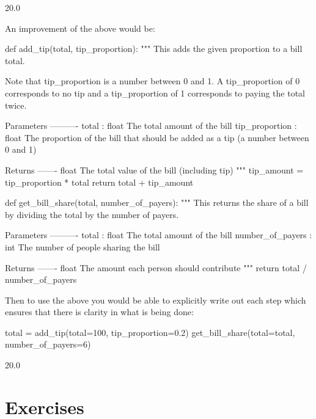 \begin{raw}
20.0
\end{raw}

An improvement of the above would be:

\begin{pyin}
def add_tip(total, tip_proportion):
    """
    This adds the given proportion to a bill total.

    Note that tip_proportion is a number between 0 and 1. A tip_proportion of 0
    corresponds to no tip and a tip_proportion of 1 corresponds to paying the
    total twice.

    Parameters
    ----------
    total : float
        The total amount of the bill
    tip_proportion : float
        The proportion of the bill that should be added as a tip (a number
        between 0 and 1)

    Returns
    -------
    float
        The total value of the bill (including tip)
    """
    tip_amount = tip_proportion * total
    return total + tip_amount


def get_bill_share(total, number_of_payers):
    """
    This returns the share of a bill by dividing the total by the number of
    payers.

    Parameters
    ----------
    total : float
        The total amount of the bill
    number_of_payers : int
        The number of people sharing the bill

    Returns
    -------
    float
        The amount each person should contribute
    """
    return total / number_of_payers
\end{pyin}


Then to use the above you would be able to explicitly write out each step which
ensures that there is clarity in what is being done:

\begin{pyin}
total = add_tip(total=100, tip_proportion=0.2)
get_bill_share(total=total, number_of_payers=6)
\end{pyin}





\begin{raw}
20.0
\end{raw}



\section{Exercises}
\label{\detokenize{building-tools/05-modularisation/exercises/main:exercises}}\label{\detokenize{building-tools/05-modularisation/exercises/main:modularisation-exercises}}\label{\detokenize{building-tools/05-modularisation/exercises/main::doc}}

